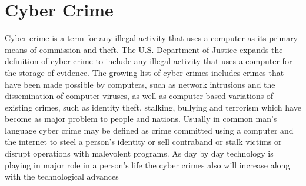 \section{Cyber Crime}
\hspace{0.3in}Cyber crime is a term for any illegal activity that 
uses a computer as its primary means of 
commission and theft. The U.S. Department of 
Justice expands the definition of cyber crime to 
include any illegal activity that uses a computer 
for the storage of evidence. The growing list of 
cyber crimes includes crimes that have been 
made possible by computers, such as network 
intrusions and the dissemination of computer 
viruses, as well as computer-based variations of 
existing crimes, such as identity 
theft, stalking, bullying and terrorism which 
have become as major problem to people and 
nations. Usually in common man’s language 
cyber crime may be defined as crime committed 
using a computer and the internet to steel a 
person’s identity or sell contraband or stalk 
victims or disrupt operations with malevolent 
programs. As day by day technology is playing 
in major role in a person’s life the cyber crimes 
also will increase along with the technological 
advances
\\


